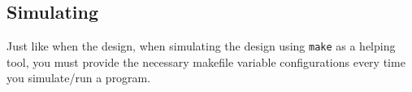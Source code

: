 \subsection{Simulating}\label{sec:Custom_Config-Simulating}
Just like when  the design, when simulating the design using \texttt{make} as a helping tool, you must provide the necessary makefile variable configurations every time you simulate/run a program.

